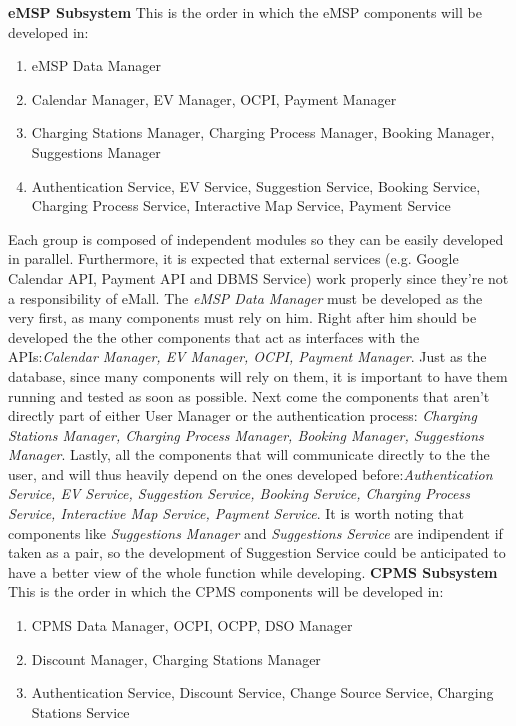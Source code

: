 \documentclass[table, 12pt]{article}
\begin{document}
\textbf{eMSP Subsystem}\newline
This is the order in which the eMSP components will be developed in:
\begin{enumerate}
    \item eMSP Data Manager 
    \item Calendar Manager, EV Manager, OCPI, Payment Manager
    \item Charging Stations Manager, Charging Process Manager, Booking Manager, Suggestions Manager
    \item Authentication Service, EV Service, Suggestion Service, Booking Service, Charging Process Service, Interactive Map Service, Payment Service
\end{enumerate}
Each group is composed of independent modules so they can be easily developed in parallel.
Furthermore, it is expected that external services (e.g. Google Calendar API, Payment API and DBMS Service) work properly since they're not a responsibility of eMall.
The \emph{eMSP Data Manager} must be developed as the very first, as many components must rely on him. Right after him should be developed the the other components that act
as interfaces with the APIs:\emph{Calendar Manager, EV Manager, OCPI, Payment Manager}. Just as the database, since many components will rely on them, it is important to have them running and tested as soon as possible.
Next come the components that aren't directly part of either User Manager or the authentication process: \emph{Charging Stations Manager, Charging Process Manager, Booking Manager, Suggestions Manager}. Lastly, all the components that will communicate directly to the 
the user, and will thus heavily depend on the ones developed before:\emph{Authentication Service, EV Service, Suggestion Service, Booking Service, Charging Process Service, Interactive Map Service, Payment Service}.
It is worth noting that components like \emph{Suggestions Manager} and \emph{Suggestions Service} are indipendent if taken as a pair, so the development of Suggestion Service could be anticipated to have a better view of the whole function while developing.
\newpage
\textbf{CPMS Subsystem}
This is the order in which the CPMS components will be developed in:
\begin{enumerate}
    \item CPMS Data Manager, OCPI, OCPP, DSO Manager
    \item Discount Manager, Charging Stations Manager
    \item Authentication Service, Discount Service, Change Source Service, Charging Stations Service
\end{enumerate}
\end{document}
